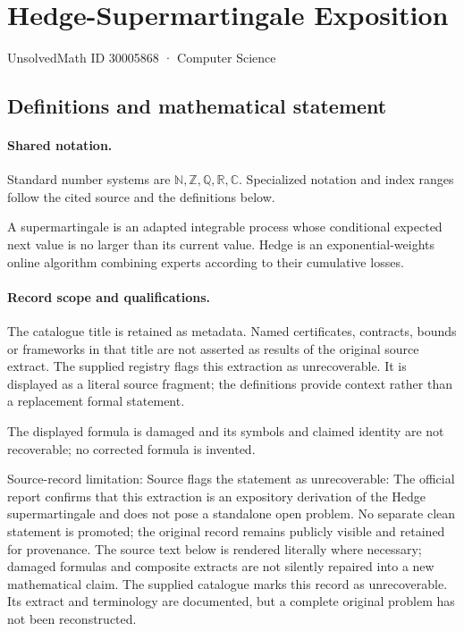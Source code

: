 \documentclass[11pt]{article}
\begin{document}
\setcounter{section}{30005867}
\section{Hedge-Supermartingale Exposition}\label{30005868}
{\small\sffamily UnsolvedMath ID 30005868 · Computer Science}
\subsection{Definitions and mathematical statement}

\paragraph{Shared notation.}Standard number systems are $\mathbb N,\mathbb Z,\mathbb Q,\mathbb R,\mathbb C$. Specialized notation and index ranges follow the cited source and the definitions below.


A supermartingale is an adapted integrable process whose conditional expected next value is no larger than its current value. Hedge is an exponential-weights online algorithm combining experts according to their cumulative losses.
\paragraph{Record scope and qualifications.}
The catalogue title is retained as metadata. Named certificates, contracts, bounds or frameworks in that title are not asserted as results of the original source extract.
The supplied registry flags this extraction as unrecoverable. It is displayed as a literal source fragment; the definitions provide context rather than a replacement formal statement.

The displayed formula is damaged and its symbols and claimed identity are not recoverable; no corrected formula is invented.

Source-record limitation: Source flags the statement as unrecoverable: The official report confirms that this extraction is an expository derivation of the Hedge supermartingale and does not pose a standalone open problem. No separate clean statement is promoted; the original record remains publicly visible and retained for provenance.
The source text below is rendered literally where necessary; damaged formulas and composite extracts are not silently repaired into a new mathematical claim.
The supplied catalogue marks this record as unrecoverable. Its extract and terminology are documented, but a complete original problem has not been reconstructed.
\end{document}

